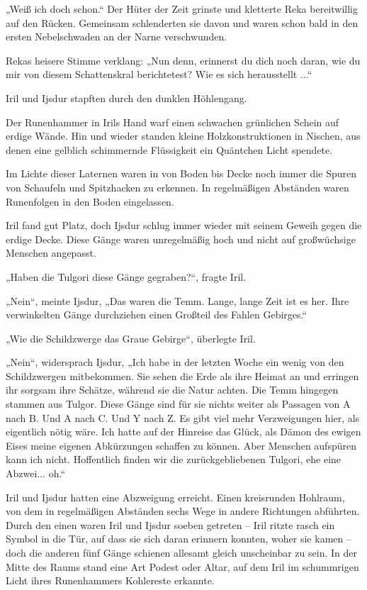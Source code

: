 „Weiß ich doch schon.“ Der Hüter der Zeit grinste und kletterte Reka bereitwillig auf den Rücken. Gemeinsam schlenderten sie davon und waren schon bald in den ersten Nebelschwaden an der Narne verschwunden.

Rekas heisere Stimme verklang: „Nun denn, erinnerst du dich noch daran, wie du mir von diesem Schattenskral berichtetest? Wie es sich herausstellt ...“\bigskip







Iril und Ijsdur stapften durch den dunklen Höhlengang.

Der Runenhammer in Irils Hand warf einen schwachen grünlichen Schein auf erdige Wände. Hin und wieder standen kleine Holzkonstruktionen in Nischen, aus denen eine gelblich schimmernde Flüssigkeit ein Quäntchen Licht spendete.

Im Lichte dieser Laternen waren in von Boden bis Decke noch immer die Spuren von Schaufeln und Spitzhacken zu erkennen. In regelmäßigen Abständen waren Runenfolgen in den Boden eingelassen.

Iril fand gut Platz, doch Ijsdur schlug immer wieder mit seinem Geweih gegen die erdige Decke. Diese Gänge waren unregelmäßig hoch und nicht auf großwüchsige Menschen angepasst.

„Haben die Tulgori diese Gänge gegraben?“, fragte Iril.

„Nein“, meinte Ijsdur, „Das waren die Temm. Lange, lange Zeit ist es her. Ihre verwinkelten Gänge durchziehen einen Großteil des Fahlen Gebirges.“

„Wie die Schildzwerge das Graue Gebirge“, überlegte Iril.

„Nein“, widersprach Ijsdur, „Ich habe in der letzten Woche ein wenig von den Schildzwergen mitbekommen. Sie sehen die Erde als ihre Heimat an und erringen ihr sorgsam ihre Schätze, während sie die Natur achten. Die Temm hingegen stammen aus Tulgor. Diese Gänge sind für sie nichts weiter als Passagen von A nach B. Und A nach C. Und Y nach Z. Es gibt viel mehr Verzweigungen hier, als eigentlich nötig wäre. Ich hatte auf der Hinreise das Glück, als Dämon des ewigen Eises meine eigenen Abkürzungen schaffen zu können. Aber Menschen aufspüren kann ich nicht. Hoffentlich finden wir die zurückgebliebenen Tulgori, ehe eine Abzwei... oh.“

Iril und Ijsdur hatten eine Abzweigung erreicht. Einen kreisrunden Hohlraum, von dem in regelmäßigen Abständen sechs Wege in andere Richtungen abführten. Durch den einen waren Iril und Ijsdur soeben getreten – Iril ritzte rasch ein Symbol in die Tür, auf dass sie sich daran erinnern konnten, woher sie kamen – doch die anderen fünf Gänge schienen allesamt gleich unscheinbar zu sein. In der Mitte des Raums stand eine Art Podest oder Altar, auf dem Iril im schummrigen Licht ihres Runenhammers Kohlereste erkannte.

